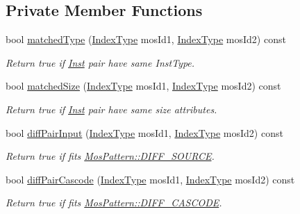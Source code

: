 \subsection*{Private Member Functions}
\begin{DoxyCompactItemize}
\item 
bool \hyperlink{classPattern_ab7112a78b0ed0c7638f1af9efdf80955}{matched\+Type} (\hyperlink{type_8h_a581e8093e28e7362f2b6937296190676}{Index\+Type} mos\+Id1, \hyperlink{type_8h_a581e8093e28e7362f2b6937296190676}{Index\+Type} mos\+Id2) const
\begin{DoxyCompactList}\small\item\em Return true if \hyperlink{classInst}{Inst} pair have same Inst\+Type. \end{DoxyCompactList}\item 
bool \hyperlink{classPattern_ae25db8902e007a9ab055e64f3347d65d}{matched\+Size} (\hyperlink{type_8h_a581e8093e28e7362f2b6937296190676}{Index\+Type} mos\+Id1, \hyperlink{type_8h_a581e8093e28e7362f2b6937296190676}{Index\+Type} mos\+Id2) const
\begin{DoxyCompactList}\small\item\em Return true if \hyperlink{classInst}{Inst} pair have same size attributes. \end{DoxyCompactList}\item 
bool \hyperlink{classPattern_a8e30aad375e98bbcdeab764705e68045}{diff\+Pair\+Input} (\hyperlink{type_8h_a581e8093e28e7362f2b6937296190676}{Index\+Type} mos\+Id1, \hyperlink{type_8h_a581e8093e28e7362f2b6937296190676}{Index\+Type} mos\+Id2) const
\begin{DoxyCompactList}\small\item\em Return true if fits \hyperlink{type_8h_af19eddb079bfea723256710b029c38e8ad45b64a7d6b85dde1b52dd5a18863933}{Mos\+Pattern\+::\+D\+I\+F\+F\+\_\+\+S\+O\+U\+R\+CE}. \end{DoxyCompactList}\item 
bool \hyperlink{classPattern_ad59ebd9a536a170735daf63126d71dea}{diff\+Pair\+Cascode} (\hyperlink{type_8h_a581e8093e28e7362f2b6937296190676}{Index\+Type} mos\+Id1, \hyperlink{type_8h_a581e8093e28e7362f2b6937296190676}{Index\+Type} mos\+Id2) const
\begin{DoxyCompactList}\small\item\em Return true if fits \hyperlink{type_8h_af19eddb079bfea723256710b029c38e8a1b7b3de4c92d42d8311e04be030655af}{Mos\+Pattern\+::\+D\+I\+F\+F\+\_\+\+C\+A\+S\+C\+O\+DE}. \end{DoxyCompactList}\item 

\end{DoxyCompactItemize}
